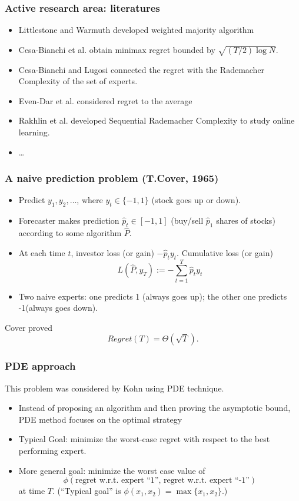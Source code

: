 \documentclass{beamer}
\begin{document}
\begin{frame}
\frametitle{Active research area: literatures}
\begin{itemize}
\item Littlestone and Warmuth developed {\color{blue}weighted majority algorithm}
\item Cesa-Bianchi et al. obtain minimax regret bounded by $\sqrt{(T/2)\log N}.$
\item Cesa-Bianchi and Lugosi connected the regret with the Rademacher Complexity of the set of experts.
\item Even-Dar et al. considered regret to the average

\item Rakhlin et al. developed {\color{blue}Sequential Rademacher Complexity} to study online learning.
\item \ldots
\end{itemize}


\end{frame}




\begin{frame}
\frametitle{A naive prediction problem (T.Cover, 1965)}
\begin{itemize}
\item Predict $y_1,y_2,\ldots$, where $y_t\in\{-1,1\}$ ({\color{blue}stock goes up or down}). 
\pause
\item Forecaster makes prediction $\hat{p}_t\in[-1,1]$ ({\color{blue}buy/sell $\hat{p}_1$ shares of stocks}) according to some algorithm $\hat{P}$. 
\pause
\item At each time $t$, investor loss (or gain) $-\hat{p}_ty_t$. Cumulative loss (or gain)
$$L(\hat{P},y_T) := -\sum_{t=1}^T\hat{p}_ty_t$$
\pause
\item Two naive experts: one  predicts 1 ({\color{blue}always goes up}); the other one  predicts -1({\color{blue}always goes down}).
\end{itemize}
Cover proved $$Regret(T) = \Theta(\sqrt{T}).$$

\end{frame}

\begin{frame}
\frametitle{PDE approach}
This problem was considered by Kohn using PDE technique.  
\begin{itemize}
\item Instead of proposing an algorithm and then proving the asymptotic bound, PDE method focuses on the optimal strategy
\pause
\item Typical Goal: minimize the worst-case regret with respect to the best performing expert.
\pause
\item More general goal: minimize the worst case value of 
$$\phi(\text{regret w.r.t. expert ``1'', regret w.r.t. expert ``-1''})$$
at time $T$. (``Typical goal'' is $\phi(x_1,x_2) = \max\{x_1,x_2\}$.)
\end{itemize}


\end{frame}
\end{document}
